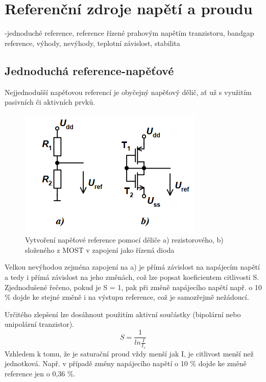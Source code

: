 \section{Referenční zdroje napětí a proudu}
-jednoduché reference, reference řízené prahovým napětím tranzistoru, bandgap reference, výhody, nevýhody, teplotní závislost, stabilita

\subsection{Jednoduchá reference-napěťové}
Nejjednodušší napěťovou referencí je obyčejný napěťový dělič, ať už s využitím pasivních či aktivních prvků.
\begin{figure}[h]
   \begin{center}
     \includegraphics[scale=0.6]{images/ref.png}
   \end{center}
   \caption{Vytvoření napěťové reference pomocí děliče a) rezistorového, b) složeného
z MOST v zapojení jako řízená dioda}
\end{figure}

Velkou nevýhodou zejména zapojení na a) je přímá závislost na napájecím napětí a tedy i přímá závislost na jeho změnách, což lze popsat koeficientem citlivosti S. Zjednodušené řečeno, pokud je S = 1, pak při změně napájecího napětí např. o 10 \% dojde ke stejné změně i na výstupu reference, což je samozřejmě nežádoucí.

Určitého zlepšení lze dosáhnout použitím aktivní součástky (bipolární nebo unipolární tranzistor).
\begin{equation}
 S = \frac{1}{ln\frac{I}{I_{s}}}
\end{equation}
Vzhledem k tomu, že je saturační proud vždy menší jak I, je citlivost menší než jednotková. Např. v případě změny napájecího napětí o 10 \% dojde ke změně reference jen o 0,36 \%.

